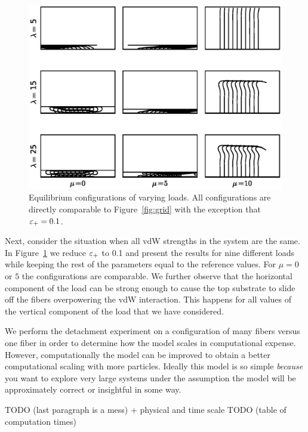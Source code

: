 	\begin{figure}
		\begin{center}
			\includegraphics[scale=1]{./fig/ch4/grid_et0.1.eps}
		\end{center}		
		\caption{Equilibrium configurations of varying loads. All configurations are directly comparable to Figure~\ref{fig:grid} with the exception that $\varepsilon_+ = 0.1$.
		\label{fig:grid_et0.1}}
	\end{figure}

	Next, consider the situation when all vdW strengths in the system are the same. In Figure~\ref{fig:grid_et0.1} we reduce $\varepsilon_+$ to 0.1 and present the results for nine different loads while keeping the rest of the parameters equal to the reference values. For $\mu = 0$ or $5$ the configurations are comparable. We further observe that the horizontal component of the load can be strong enough to cause the top substrate to slide off the fibers overpowering the vdW interaction. This happens for all values of the vertical component of the load that we have considered.
	
	We perform the detachment experiment on a configuration of many fibers versus one fiber in order to determine how the model scales in computational expense. However, computationally the model can be improved to obtain a better computational scaling with more particles. Ideally this model is so simple \textit{because} you want to explore very large systems under the assumption the model will be approximately correct or insightful in some way.

TODO (last paragraph is a mess) + physical and time scale
TODO (table of computation times)

	
